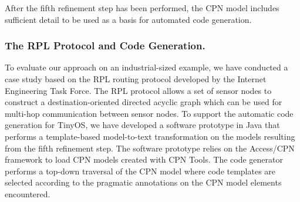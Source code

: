 \documentclass{llncs}
\begin{document}
\noindent
After the fifth refinement step has been performed, the CPN model
includes sufficient detail to be used as a basis for automated code
generation.
 
\vspace*{-0.75em}
\subsubsection{The RPL Protocol and Code Generation.}

To evaluate our approach on an industrial-sized example, we have
conducted a case study based on the RPL routing protocol
\cite{rplprotocol} developed by the Internet Engineering Task
Force. The RPL protocol allows a set of sensor nodes to construct a
destination-oriented directed acyclic graph which can be used for
multi-hop communication between sensor nodes.  To support the
automatic code generation for TinyOS, we have developed a software
prototype in Java that performs a template-based model-to-text
transformation on the models resulting from the fifth refinement
step. The software prototype relies on the Access/CPN framework
\cite{accesscpn} to load CPN models created with CPN Tools. The code
generator performs a top-down traversal of the CPN model where code
templates are selected according to the pragmatic annotations on the
CPN model elements encountered.






\end{document}
